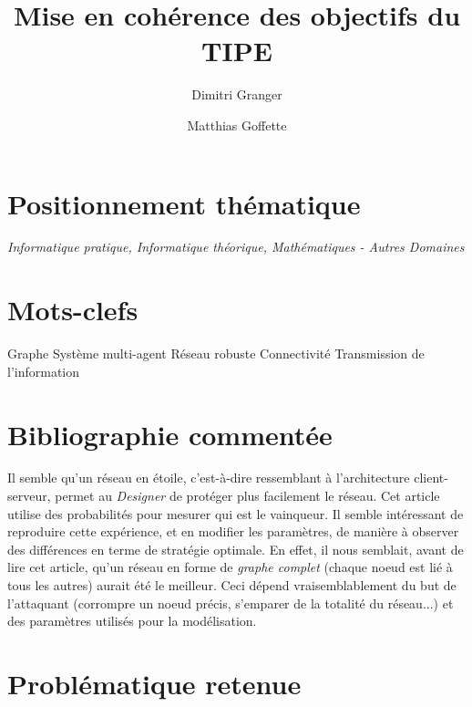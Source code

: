 \documentclass[11pt,a4paper]{article}
\title{Mise en cohérence des objectifs du TIPE}
\author{Dimitri Granger \and Matthias Goffette}
\begin{document}

\maketitle


\section{Positionnement thématique}


%

\emph{Informatique pratique, Informatique théorique, Mathématiques - Autres Domaines}


\section{Mots-clefs}

%
%

\begin{it}
Graphe
Système multi-agent
Réseau robuste
Connectivité
Transmission de l'information
\end{it}


\section{Bibliographie commentée}

		Il semble qu'un réseau en étoile, c'est-à-dire ressemblant à l'architecture client-serveur, permet au \emph{Designer} de protéger plus facilement le réseau\cite{goyal14}. Cet article utilise des probabilités pour mesurer qui est le vainqueur. Il semble intéressant de reproduire cette expérience, et en modifier les paramètres, de manière à observer des différences en terme de stratégie optimale. En effet, il nous semblait, avant de lire cet article, qu'un réseau en forme de \emph{graphe complet} (chaque noeud est lié à tous les autres) aurait été le meilleur. Ceci dépend vraisemblablement du but de l'attaquant (corrompre un noeud précis, s'emparer de la totalité du réseau...) et des paramètres utilisés pour la modélisation.




\section{Problématique retenue}
\end{document}

